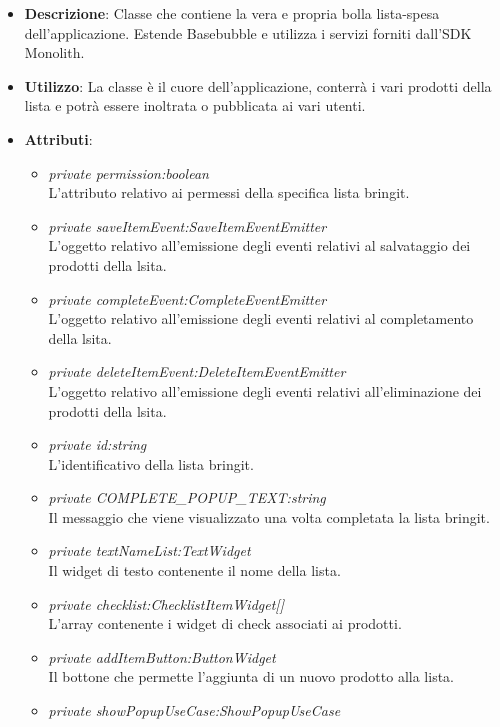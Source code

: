 \begin{itemize}
\item \textbf{Descrizione}: Classe che contiene la vera e propria bolla lista-spesa dell'applicazione. Estende Basebubble e utilizza i servizi forniti dall'SDK Monolith.
\item \textbf{Utilizzo}: La classe è il cuore dell'applicazione, conterrà i vari prodotti della lista e potrà essere inoltrata o pubblicata ai vari utenti.
\item \textbf{Attributi}: 
	\begin{itemize}
	\item \textit{private permission:boolean}\\
	L'attributo relativo ai permessi della specifica lista bringit.
	\item \textit{private saveItemEvent:SaveItemEventEmitter}\\
	L'oggetto relativo all'emissione degli eventi relativi al salvataggio dei prodotti della lsita.
	\item \textit{private completeEvent:CompleteEventEmitter}\\
	L'oggetto relativo all'emissione degli eventi relativi al completamento della lsita.
	\item \textit{private deleteItemEvent:DeleteItemEventEmitter}\\
	L'oggetto relativo all'emissione degli eventi relativi all'eliminazione dei prodotti della lsita.
	\item \textit{private id:string}\\
	L'identificativo della lista bringit.
	\item \textit{private COMPLETE\_POPUP\_TEXT:string}\\
	Il messaggio che viene visualizzato una volta completata la lista bringit.
	\item \textit{private textNameList:TextWidget}\\
	Il widget di testo contenente il nome della lista.
	\item \textit{private checklist:ChecklistItemWidget[]}\\
	L'array contenente i widget di check associati ai prodotti.
	\item \textit{private addItemButton:ButtonWidget}\\
	Il bottone che permette l'aggiunta di un nuovo prodotto alla lista.
	\item \textit{private showPopupUseCase:ShowPopupUseCase}\\
	\end{itemize}

\end{itemize}
